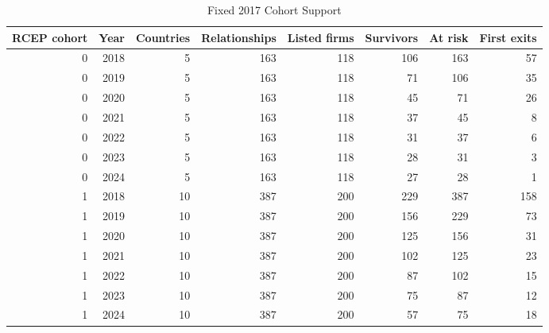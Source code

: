 \begin{table}
\caption{Fixed 2017 Cohort Support}
\label{tab:table1_cohort_support}
\begin{tabular}{rrrrrrrr}
\toprule
RCEP cohort & Year & Countries & Relationships & Listed firms & Survivors & At risk & First exits \\
\midrule
0 & 2018 & 5 & 163 & 118 & 106 & 163 & 57 \\
0 & 2019 & 5 & 163 & 118 & 71 & 106 & 35 \\
0 & 2020 & 5 & 163 & 118 & 45 & 71 & 26 \\
0 & 2021 & 5 & 163 & 118 & 37 & 45 & 8 \\
0 & 2022 & 5 & 163 & 118 & 31 & 37 & 6 \\
0 & 2023 & 5 & 163 & 118 & 28 & 31 & 3 \\
0 & 2024 & 5 & 163 & 118 & 27 & 28 & 1 \\
1 & 2018 & 10 & 387 & 200 & 229 & 387 & 158 \\
1 & 2019 & 10 & 387 & 200 & 156 & 229 & 73 \\
1 & 2020 & 10 & 387 & 200 & 125 & 156 & 31 \\
1 & 2021 & 10 & 387 & 200 & 102 & 125 & 23 \\
1 & 2022 & 10 & 387 & 200 & 87 & 102 & 15 \\
1 & 2023 & 10 & 387 & 200 & 75 & 87 & 12 \\
1 & 2024 & 10 & 387 & 200 & 57 & 75 & 18 \\
\bottomrule
\end{tabular}
\end{table}

